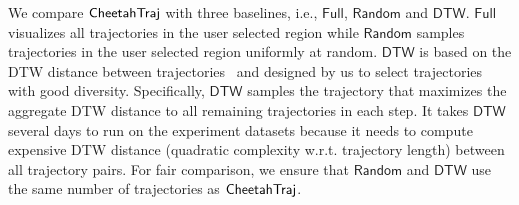 
 We compare $\mathsf{CheetahTraj}$ with three baselines, i.e., $\mathsf{Full}$, $\mathsf{Random}$ and $\mathsf{DTW}$. $\mathsf{Full}$ visualizes all trajectories in the user selected region while $\mathsf{Random}$ samples trajectories in the user selected region uniformly at random. $\mathsf{DTW}$ is based on the DTW distance between trajectories~\cite{borcan2012improving} and designed by us to select trajectories with good diversity. Specifically, $\mathsf{DTW}$ samples the trajectory that maximizes the aggregate DTW distance to all remaining trajectories in each step. It takes $\mathsf{DTW}$ several days to run on the experiment datasets because it needs to compute expensive DTW distance (quadratic complexity w.r.t. trajectory length) between all trajectory pairs. For fair comparison, we ensure that $\mathsf{Random}$ and $\mathsf{DTW}$ use the same number of trajectories as $\mathsf{CheetahTraj}$.




